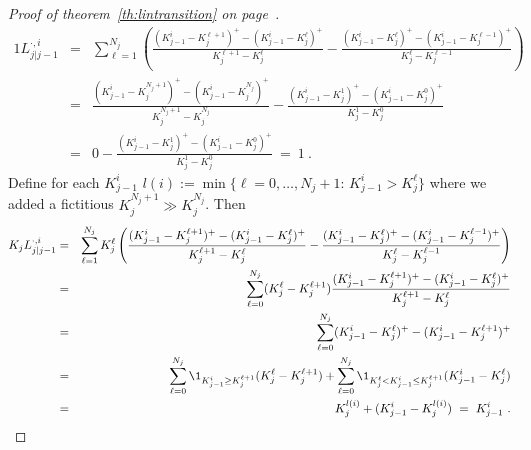\documentclass[twoside]{article}
\theoremstyle{plain}
\theoremstyle{definition}
\theoremstyle{remark}
\begin{document}
\begin{proof}[Proof of theorem~\ref{th:lintransition} on page~\pageref{th:lintransition}]
\begin{eqnarray}
    1 L^{\cdot,i}_{j|j-1} & = &
            \sum_{\ell=1}^{N_j} 
        \left( 
        \frac{ ( K^i_{j-1} - K^{\ell+1}_j )^+ - ( K^i_{j-1} - K^\ell_j )^+ }{ K^{\ell+1}_j - K^{\ell}_j }
        -
        \frac{ ( K^i_{j-1} - K^{\ell}_j )^+ - ( K^i_{j-1} - K^{\ell-1}_j )^+ }{ K^{\ell}_j - K^{\ell-1}_j }
        \right)
        \\
        & = &
        \frac{ ( K^i_{j-1} - K^{N_j+1}_j )^+ - ( K^i_{j-1} - K^{N_j}_j )^+ }{ K^{N_j+1}_j - K^{N_j}_j }
        -
        \frac{ ( K^i_{j-1} - K^1_j )^+ - ( K^i_{j-1} - K^0_j )^+ }{ K^1_j - K^0_j }
        \\
        & = &
        0
        -
        \frac{ ( K^i_{j-1} - K^1_j )^+ - ( K^i_{j-1} - K^0_j )^+ }{ K^1_j - K^0_j } \ = \ 1 \ .
\end{eqnarray}
Define for each $K^i_{j-1}$ $l(i) := \min\{\ell=0,\ldots,N_j+1:\,K^i_{j-1} > K^\ell_j\}$
where we added a fictitious $K^{N_j+1}_j\gg K^{N_j}_j$. Then
\begin{eqnarray}
    K_j L^{\cdot,i}_{j|j-1} & = &
            \sum_{\ell=1}^{N_j} K_j^\ell
        \left( 
        \frac{ ( K^i_{j-1} - K^{\ell+1}_j )^+ - ( K^i_{j-1} - K^\ell_j )^+ }{ K^{\ell+1}_j - K^{\ell}_j }
        -
        \frac{ ( K^i_{j-1} - K^{\ell}_j )^+ - ( K^i_{j-1} - K^{\ell-1}_j )^+ }{ K^{\ell}_j - K^{\ell-1}_j }
        \right)
        \\
        & = &
            \sum_{\ell=0}^{N_j} ( K_j^\ell - K_j^{\ell+1} )  
        \frac{ ( K^i_{j-1} - K^{\ell+1}_j )^+ - ( K^i_{j-1} - K^\ell_j )^+ }{ K^{\ell+1}_j - K^{\ell}_j }
        \\
        & = &
            \sum_{\ell=0}^{N_j} 
        ( K^i_{j-1} - K^\ell_j )^+ - ( K^i_{j-1} - K^{\ell+1}_j )^+ 
        \\
        & = &
            \sum_{\ell=0}^{N_j} \1_{K^i_{j-1} \geq K^{\ell+1}_j } ( K^\ell_j - K^{\ell+1}_j ) 
            +  \sum_{\ell=0}^{N_j}  \1_{K^{\ell}_j < K^i_{j-1} \leq K^{\ell+1}_j } ( K^i_{j-1}  - K^\ell_j  )
        \\
        & = &
            K^{l(i)}_j
            + ( K^i_{j-1}  - K^{l(i)}_j  )  \ = \ K^i_{j-1} \ .
\end{eqnarray}
\end{proof}
\end{document}
